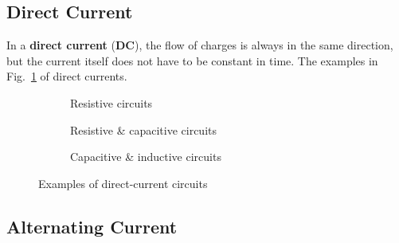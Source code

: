 \subsection{Direct Current}
In a \textbf{direct current} (\textbf{DC}), the flow of charges is always in
the same direction, but the current itself does not have to be constant in
time. The examples in Fig.~\ref{fig:DC-examples} of direct currents.
\begin{figure}[ht]
  \centering
  \begin{subfigure}{.28\textwidth}
    \centering
    \caption{Resistive circuits}
  \end{subfigure}
  \begin{subfigure}{.34\textwidth}
    \centering
    \caption{Resistive \& capacitive circuits}
  \end{subfigure}
  \begin{subfigure}{.34\textwidth}
    \centering
    \caption{Capacitive \& inductive circuits}
  \end{subfigure}
  \caption{Examples of direct-current circuits}
  \label{fig:DC-examples}
\end{figure}



\subsection{Alternating Current}

